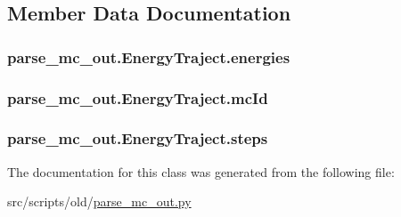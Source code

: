 \subsection{Member Data Documentation}
\hypertarget{classparse__mc__out_1_1_energy_traject_afec19ac593c5be2a29167a6ec21b951f}{
\subsubsection[{energies}]{\setlength{\rightskip}{0pt plus 5cm}parse\-\_\-mc\-\_\-out.\-Energy\-Traject.\-energies}}\label{classparse__mc__out_1_1_energy_traject_afec19ac593c5be2a29167a6ec21b951f}
\hypertarget{classparse__mc__out_1_1_energy_traject_a5dd33d48943a8013e66d012e0fd408fc}{
\subsubsection[{mc\-Id}]{\setlength{\rightskip}{0pt plus 5cm}parse\-\_\-mc\-\_\-out.\-Energy\-Traject.\-mc\-Id}}\label{classparse__mc__out_1_1_energy_traject_a5dd33d48943a8013e66d012e0fd408fc}
\hypertarget{classparse__mc__out_1_1_energy_traject_a827f43a08531e3bd0b1e51e216a06a9c}{
\subsubsection[{steps}]{\setlength{\rightskip}{0pt plus 5cm}parse\-\_\-mc\-\_\-out.\-Energy\-Traject.\-steps}}\label{classparse__mc__out_1_1_energy_traject_a827f43a08531e3bd0b1e51e216a06a9c}


The documentation for this class was generated from the following file\-:\begin{DoxyCompactItemize}
\item 
src/scripts/old/\hyperlink{parse__mc__out_8py}{parse\-\_\-mc\-\_\-out.\-py}\end{DoxyCompactItemize}
